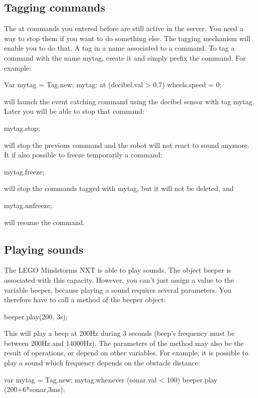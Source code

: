 \subsection{Tagging commands}
The at commands you entered before are still active in the server. You need a
way to stop them if you want to do something else. The tagging mechanism will
enable you to do that.
A tag in a name associated to a command. To tag a command with the name mytag,
create it and simply prefix the command. For example:
\begin{urbiunchecked}
  Var mytag = Tag.new; mytag: at (decibel.val > 0.7) wheels.speed = 0;
\end{urbiunchecked}

will launch the event catching command using the decibel sensor with tag mytag.
Later you will be able to stop that command:
\begin{urbiunchecked}
  mytag.stop;
\end{urbiunchecked}

will stop the previous command and the robot will not react to sound anymore.
It if also possible to freeze temporarily a command:
\begin{urbiunchecked}
  mytag.freeze;
\end{urbiunchecked}

will stop the commands tagged with mytag, but it will not be deleted, and
\begin{urbiunchecked}
  mytag.unfreeze;
\end{urbiunchecked}

will resume the command.

\subsection{Playing sounds}
\label{sec:nxt:sounds}
The LEGO Mindstorms NXT is able to play sounds. The object beeper is associated
with this capacity. However, you can't just assign a value to the variable
beeper, because playing a sound requires several parameters. You therefore have
to call a method of the beeper object:
\begin{urbiunchecked}
  beeper.play(200, 3s);
\end{urbiunchecked}

This will play a beep at 200Hz during 3 seconds (beep's frequency must be
between 200Hz and 14000Hz).
The parameters of the method may also be the result of operations, or depend on
other variables. For example, it is possible to play a sound which frequency
depends on the obstacle distance:
\begin{urbiunchecked}
  var mytag = Tag.new; mytag:whenever (sonar.val < 100) beeper.play
(200+6*sonar,3ms);
\end{urbiunchecked}

